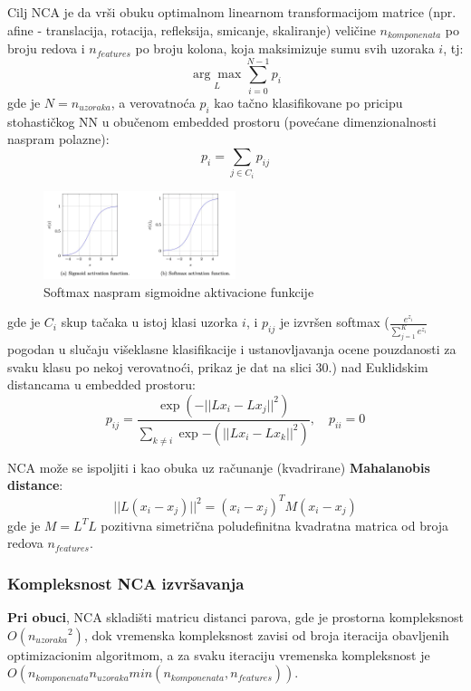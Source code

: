 \documentclass[fontsize=12bp, paper=a4]{scrarticle}
\begin{document}
Cilj NCA je da vrši obuku optimalnom  linearnom transformacijom matrice (npr. afine - translacija, rotacija, refleksija, smicanje, skaliranje)\cite{lineartransformations} veličine $n_{komponenata}$ po broju redova i $n_{features}$ po broju kolona, koja maksimizuje sumu svih uzoraka $i$, tj:
$$\underset{L}{\arg\max} \sum\limits_{i=0}^{N - 1} p_{i}$$
gde je $N = n_{uzoraka}$, a verovatnoća $p_i$ kao tačno klasifikovane po pricipu stohastičkog NN u obučenom embedded prostoru (povećane dimenzionalnosti naspram polazne)\cite{embedded}: 
$$p_{i}=\sum\limits_{j \in C_i}{p_{i j}}$$

\begin{figure}[h!]
    \centering
    \includegraphics[width=0.5\textwidth]{image-33.png}
    \caption{Softmax naspram sigmoidne aktivacione funkcije}
\end{figure}

gde je $C_i$ skup tačaka u istoj klasi uzorka $i$, i $p_{ij}$ je izvršen softmax ($\frac{e^{z_i}}{\sum_{j=1}^K e^{z_i}}$ pogodan u slučaju višeklasne klasifikacije i ustanovljavanja ocene pouzdanosti za svaku klasu po nekoj verovatnoći, prikaz je dat na slici 30.)\cite{softmax} nad Euklidskim distancama u embedded prostoru:
$$
p_{i j} = \frac{\exp(-||L x_i - L x_j||^2)}{\sum\limits_{k \ne
          i} {\exp{-(||L x_i - L x_k||^2)}}} , \quad p_{i i} = 0
$$

NCA može se ispoljiti i kao obuka uz računanje (kvadrirane) \textbf{Mahalanobis distance}: 
$$|| L(x_i - x_j)||^2 = (x_i - x_j)^TM(x_i - x_j)$$
gde je $M = L^T L$ pozitivna simetrična poludefinitna kvadratna matrica\cite{definitemx} od broja redova $n_{features}$.

\subsubsection{Kompleksnost NCA izvršavanja}

\textbf{Pri obuci}, NCA skladišti matricu distanci parova, gde je prostorna kompleksnost $O({n_{uzoraka}}^2)$, dok vremenska kompleksnost zavisi od broja iteracija obavljenih optimizacionim algoritmom, a za svaku iteraciju vremenska kompleksnost je $O(n_{komponenata}n_{uzoraka}min(n_{komponenata}, n_{features}))$.
\end{document}
